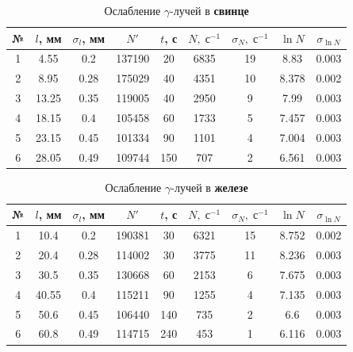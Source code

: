 \documentclass[12pt]{kiarticle}
\newcommand{\ga}{\ensuremath{\gamma}}
\begin{document}
\begin{table}[h!]
	\caption{Ослабление \ga-лучей в \textbf{свинце}}
	\begin{center}
		\begin{tabular}{|c|c|c|c|c|c|c|c|c|}
			\hline
			№ & $ l $, мм & $ \sigma_l $, мм & $ N' $ & $ t $, с & $ N, \; с^{-1}$  & $ \sigma_N, \; с^{-1}$ & $ \ln N $ & $ \sigma_{\ln N} $ \\
			\hline
			1 & 4.55 & 0.2 & 137190 & 20 & 6835 & 19 & 8.83 & 0.003 \\
			2 & 8.95 & 0.28 & 175029 & 40 & 4351 & 10 & 8.378 & 0.002 \\
			3 & 13.25 & 0.35 & 119005 & 40 & 2950 & 9 & 7.99 & 0.003 \\
			4 & 18.15 & 0.4 & 105458 & 60 & 1733 & 5 & 7.457 & 0.003 \\
			5 & 23.15 & 0.45 & 101334 & 90 & 1101 & 4 & 7.004 & 0.003 \\
			6 & 28.05 & 0.49 & 109744 & 150 & 707 & 2 & 6.561 & 0.003 \\
			\hline
		\end{tabular}
	\end{center}
	\label{table_1}
\end{table}

\begin{table}[h!]
	\caption{Ослабление \ga-лучей в \textbf{железе}}
	\begin{center}
		\begin{tabular}{|c|c|c|c|c|c|c|c|c|}
			\hline
			№ & $ l $, мм & $ \sigma_l $, мм & $ N' $ & $ t $, с & $ N, \; с^{-1}$  & $ \sigma_N, \; с^{-1}$ & $ \ln N $ & $ \sigma_{\ln N} $ \\
			\hline
			1 & 10.4 & 0.2 & 190381 & 30 & 6321 & 15 & 8.752 & 0.002 \\
			2 & 20.4 & 0.28 & 114002 & 30 & 3775 & 11 & 8.236 & 0.003 \\
			3 & 30.5 & 0.35 & 130668 & 60 & 2153 & 6 & 7.675 & 0.003 \\
			4 & 40.55 & 0.4 & 115211 & 90 & 1255 & 4 & 7.135 & 0.003 \\
			5 & 50.6 & 0.45 & 106440 & 140 & 735 & 2 & 6.6 & 0.003 \\
			6 & 60.8 & 0.49 & 114715 & 240 & 453 & 1 & 6.116 & 0.003 \\
			\hline
		\end{tabular}
	\end{center}
	\label{table_2}
\end{table}
\end{document}
